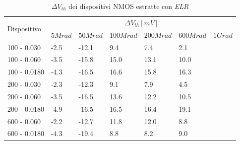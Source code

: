 \documentclass[12pt, letterpaper]{book}
\begin{document}
\begin{table}[H]
  \renewcommand{\arraystretch}{1.3}
  \begin{tabular}{m{2.1cm}  m{1.1cm} m{1.3cm} m{1.5cm} m{1.5cm} m{1.5cm} m{1cm}}
    \toprule
    \multirow{2}{*}{Dispositivo} & \multicolumn{6}{c}{$\Delta V_{th} [mV] $}                                                          \\
    \cmidrule{2-7}
                                 & $5Mrad$                                   & $50Mrad$ & $100Mrad$ & $200Mrad$ & $600Mrad$ & $1Grad$ \\
    \midrule
    100 - 0.030                     & -2.5                                      & -12.1    & 9.4       & 7.4       & 2.1       &         \\
    \hline
    100 - 0.060                     & -3.5                                      & -15.8    & 15.0      & 13.1      & 10.0      &         \\
    \hline
    100 - 0.0180                    & -4.3                                      & -16.5    & 16.6      & 15.8      & 16.3      &         \\
    \hline
    200 - 0.030                     & -2.3                                      & -12.3    & 9.1       & 7.9       & 4.5       &         \\
    \hline
    200 - 0.060                     & -3.5                                      & -16.5    & 13.6      & 12.2      & 10.5      &         \\
    \hline
    200 - 0.0180                    & -4.9                                      & -16.5    & 16.5      & 16.4      & 19.1      &         \\
    \hline
    600 - 0.060                     & -2.2                                      & -12.7    & 11.8      & 12.0      & 8.8       &         \\
    \hline
    600 - 0.0180                    & -4.3                                      & -19.4    & 8.8       & 8.2       & 9.0       &         \\
    \bottomrule
  \end{tabular}
  \caption{$\Delta V_{th}$ dei dispositivi NMOS estratte con \emph{ELR}}
  \label{tab:deltaVthELRN}
\end{table}
\end{document}
